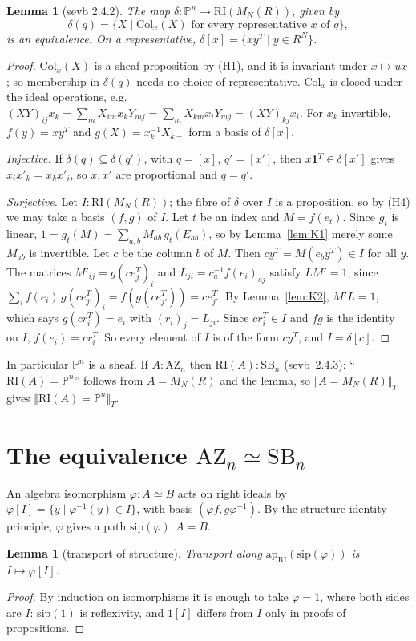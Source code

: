 \documentclass[11pt]{amsart}
\newtheorem{lemma}[theorem]{Lemma}
\theoremstyle{definition}
\theoremstyle{remark}
\newcommand{\Pn}{\mathbb{P}^n}
\newcommand{\M}{M_N(R)}
\newcommand{\AZ}{\mathrm{AZ}_n}
\newcommand{\SB}{\mathrm{SB}_n}
\newcommand{\RI}{\mathrm{RI}}
\newcommand{\trT}[1]{\Vert #1\Vert_T}
\newcommand{\Col}{\mathrm{Col}}
\begin{document}
\begin{lemma}[sevb 2.4.2]\label{lem:delta}
The map $\delta:\Pn\to\RI(\M)$, given by
\[\delta(q)=\{X\mid\Col_x(X)\text{ for every representative }x\text{ of }q\},\]
is an equivalence. On a representative, $\delta[x]=\{xy^T\mid y\in R^N\}$.
\end{lemma}
\begin{proof}
$\Col_x(X)$ is a sheaf proposition by (H1), and it is invariant under
$x\mapsto ux$; so membership in $\delta(q)$ needs no choice of
representative. $\Col_x$ is closed under the ideal operations, e.g.\
$(XY)_{ij}x_k=\sum_mX_{im}x_kY_{mj}=\sum_mX_{km}x_iY_{mj}=(XY)_{kj}x_i$. For
$x_k$ invertible, $f(y)=xy^T$ and $g(X)=x_k^{-1}X_{k-}$ form a basis of
$\delta[x]$.

\emph{Injective.} If $\delta(q)\subseteq\delta(q')$, with $q=[x]$,
$q'=[x']$, then $x\mathbf 1^T\in\delta[x']$ gives $x_ix'_k=x_kx'_i$, so $x,x'$
are proportional and $q=q'$.

\emph{Surjective.} Let $I:\RI(\M)$; the fibre of $\delta$ over $I$ is a
proposition, so by (H4) we may take a basis $(f,g)$ of $I$. Let $t$ be an
index and $M=f(e_t)$. Since $g_t$ is linear,
$1=g_t(M)=\sum_{a,b}M_{ab}\,g_t(E_{ab})$, so by Lemma~\ref{lem:K1} merely
some $M_{ab}$ is invertible. Let $c$ be the column $b$ of $M$. Then
$cy^T=M(e_by^T)\in I$ for all $y$. The matrices $M'_{ij}=g(ce_j^T)_i$ and
$L_{ji}=c_a^{-1}f(e_i)_{aj}$ satisfy $LM'=1$, since
$\sum_if(e_i)\,g(ce_{j'}^T)_i=f(g(ce_{j'}^T))=ce_{j'}^T$. By
Lemma~\ref{lem:K2}, $M'L=1$, which says $g(cr_i^T)=e_i$ with $(r_i)_j=L_{ji}$.
Since $cr_i^T\in I$ and $fg$ is the identity on $I$, $f(e_i)=cr_i^T$. So every element of $I$ is of the form
$cy^T$, and $I=\delta[c]$.
\end{proof}

In particular $\Pn$ is a sheaf. If $A:\AZ$ then $\RI(A):\SB$
(sevb~2.4.3): ``$\RI(A)=\Pn$'' follows from $A=\M$ and the lemma, so
$\trT{A=\M}$ gives $\trT{\RI(A)=\Pn}$.

\section{The equivalence $\AZ\simeq\SB$}

An algebra isomorphism $\varphi:A\simeq B$ acts on right ideals by
$\varphi[I]=\{y\mid\varphi^{-1}(y)\in I\}$, with basis $(\varphi f,
g\varphi^{-1})$. By the structure identity principle, $\varphi$ gives a
path $\mathrm{sip}(\varphi):A=B$.

\begin{lemma}[transport of structure]\label{lem:transport}
Transport along $\mathrm{ap}_{\RI}(\mathrm{sip}(\varphi))$ is
$I\mapsto\varphi[I]$.
\end{lemma}
\begin{proof}
By induction on isomorphisms it is enough to take $\varphi=1$, where both
sides are $I$: $\mathrm{sip}(1)$ is reflexivity, and $1[I]$ differs from $I$
only in proofs of propositions.
\end{proof}
\end{document}
